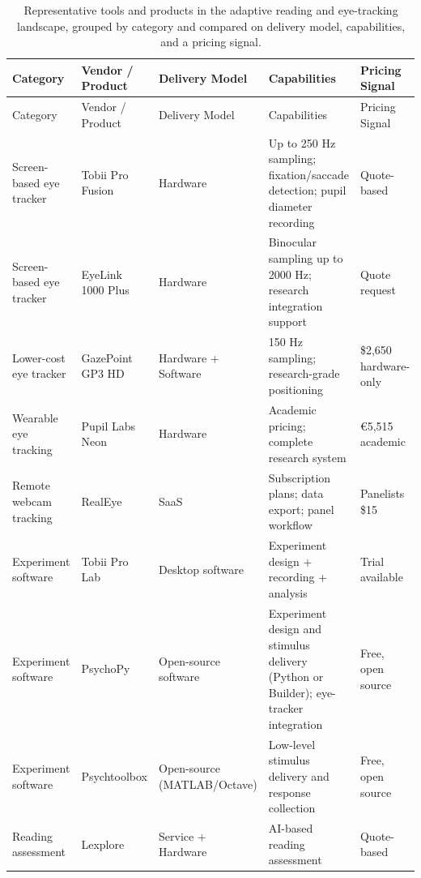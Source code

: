 \begingroup
\small
\setlength{\tabcolsep}{4pt}
\begin{longtable}{p{2.6cm}p{2.6cm}p{2.2cm}p{3.7cm}p{2.2cm}}
\caption[Representative tools and products in the landscape.]{Representative tools and products in the adaptive reading and eye-tracking landscape, grouped by category and compared on delivery model, capabilities, and a pricing signal.}
\label{tab:market-landscape}\\
\toprule
Category & Vendor / Product & Delivery Model & Capabilities & Pricing Signal \\
\midrule
\endfirsthead
\toprule
Category & Vendor / Product & Delivery Model & Capabilities & Pricing Signal \\
\midrule
\endhead
Screen-based eye tracker & Tobii Pro Fusion & Hardware & Up to 250 Hz sampling; fixation/saccade detection; pupil diameter recording \cite{tobii2025fusion} & Quote-based \cite{tobii2025fusion} \\
Screen-based eye tracker & EyeLink 1000 Plus & Hardware & Binocular sampling up to 2000 Hz; research integration support \cite{srresearch2025eyelink} & Quote request \cite{srresearch2025eyelinkquote} \\
Lower-cost eye tracker & GazePoint GP3 HD & Hardware + Software & 150 Hz sampling; research-grade positioning \cite{gazepoint2025gp3} & \$2,650 hardware-only \cite{gazepoint2025gp3} \\
Wearable eye tracking & Pupil Labs Neon & Hardware & Academic pricing; complete research system \cite{pupillabs2025neon} & €5,515 academic \cite{pupillabs2025neon} \\
Remote webcam tracking & RealEye & SaaS & Subscription plans; data export; panel workflow \cite{realeye2025pricingdocs} & Panelists \$15 \cite{realeye2025pricing} \\
Experiment software & Tobii Pro Lab & Desktop software & Experiment design + recording + analysis \cite{tobii2025prolab} & Trial available \cite{tobii2025prolab} \\
Experiment software & PsychoPy & Open-source software & Experiment design and stimulus delivery (Python or Builder); eye-tracker integration \cite{peirce2019psychopy} & Free, open source \cite{peirce2019psychopy} \\
Experiment software & Psychtoolbox & Open-source (MATLAB/Octave) & Low-level stimulus delivery and response collection \cite{brainard1997psychtoolbox} & Free, open source \cite{brainard1997psychtoolbox} \\
Reading assessment & Lexplore & Service + Hardware & AI-based reading assessment \cite{lexplore2025assessment} & Quote-based \cite{lexplore2025pricing} \\

\end{longtable}
